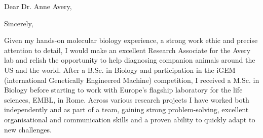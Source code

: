 \documentclass[11pt,a4paper,sans]{moderncv}
\begin{document}
\thispagestyle{titlepage}
\date{\today}
\opening{Dear Dr. Anne Avery,}
\closing{Sincerely,}
\makelettertitle
\begin{spacing}{1.1}

Given my hands-on molecular biology experience, a strong work ethic and precise attention to detail, I would make an excellent Research Associate for the Avery lab and relish the opportunity to help diagnosing companion animals around the US and the world. After a B.Sc. in Biology and participation in the iGEM (international Genetically Engineered Machine) competition, I received a M.Sc. in Biology before starting to work with Europe's flagship laboratory for the life sciences, EMBL, in Rome. Across various research projects I have worked both independently and as part of a team, gaining strong problem-solving, excellent organisational and communication skills and a proven ability to quickly adapt to new challenges.
\par%


\end{spacing}
\end{document}
